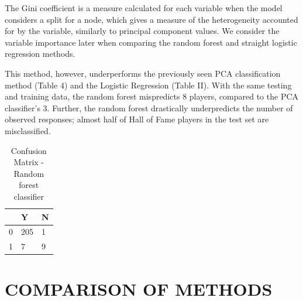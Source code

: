 \documentclass[letterpaper, 10 pt, conference]{ieeeconf}
\begin{document}
The Gini coefficient is a measure calculated for each variable when the model considers a split for a node, which gives a measure of the heterogeneity accounted for by the variable, similarly to principal component values. We consider the variable importance later when comparing the random forest and straight logistic regression methods.

This method, however, underperforms the previously seen PCA classification method (Table 4) and the Logistic Regression (Table II). With the same testing and training data, the random forest mispredicts 8 players, compared to the PCA classifier's 3. Further, the random forest drastically underpredicts the number of observed responses; almost half of Hall of Fame players in the test set are misclassified. 

\begin{table}[h]
\centering
\caption{Confusion Matrix - Random forest classifier}
\begin{tabular}{l|l|l|}
\cline{2-3}
 & Y & N \\ \hline
\multicolumn{1}{|l|}{0} & 205 & 1 \\ \hline
\multicolumn{1}{|l|}{1} & 7 & 9 \\ \hline
\end{tabular}
\end{table}

\section{COMPARISON OF METHODS}
	
\end{document}
